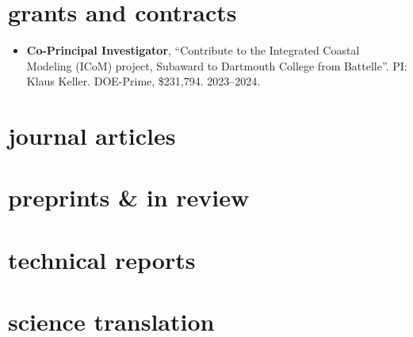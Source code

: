 \documentclass[10pt,oneside]{article}
\begin{document}

\section{grants and contracts}

\mbox{}\vspace{-\dimexpr\baselineskip\relax}

\begin{itemize}[label={}]
  
  \item \textbf{Co-Principal Investigator}, \enquote{Contribute to the Integrated Coastal Modeling (ICoM) project, Subaward to Dartmouth College from Battelle}.  PI: Klaus Keller. {DOE-Prime}, \$231,794. 2023--2024.
        
\end{itemize}


\section{journal articles}

\mbox{}\vspace{-\dimexpr\baselineskip\relax}
\vspace*{-1em}

\uspunctuation

\printbibliography[type=article, heading=none]

\section{preprints \& in review}

\mbox{}\vspace{-\dimexpr\baselineskip\relax}
\vspace*{-1em}
\printbibliography[type=unpublished, heading=none]

\section{technical reports}

\mbox{}\vspace{-\dimexpr\baselineskip\relax}
\vspace*{-1em}
\printbibliography[type=report, heading=none]

\section{science translation}
\end{document}
